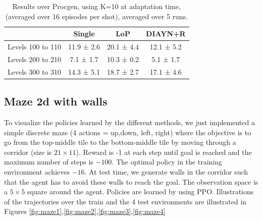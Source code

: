 \begin{table}[h!]
\begin{center}
    \begin{tabular}{l|c|c|c|} \toprule
        &	Single	& LoP &	DIAYN+R 	\\ \hline

Levels 100 to 110	&	11.9 ± 2.6	& 20.1 ± 4.4	& 12.1 ± 5.2		\\ 
Levels 200 to 210	&	7.1 ± 1.7	& 10.3 ± 0.2	& 5.1 ± 1.7		\\ 
Levels 300 to 310	&	14.3 ± 5.1	& 18.7 ± 2.7	& 17.1 ± 4.6		\\ \hline
\end{tabular}
\caption{Results over Procgen, using K=10 at adaptation time, (averaged over 16 episodes per shot), averaged over 5 runs. }
\end{center}
\end{table}


\newpage

\subsection{Maze 2d with walls}
\label{subsec:maze2d}

To visualize the policies learned by the different methods, we just implemented a simple discrete maze (4 actions = up,down, left, right) where the objective is to go from the top-middle tile to the bottom-middle tile by moving through a corridor (size is $21 \times 11$). Reward is -1 at each step until goal is reached and the maximum number of steps is $-100$. The optimal policy in the training environment achieves $-16$.  At test time, we generate walls in the corridor such that the agent has to avoid these walls to reach the goal. The observation space is a $5 \times 5$ square around the agent. Policies are learned by using PPO. 
Illustrations of the trajectories over the train and the 4 test environments are illustrated in Figures \ref{fig:maze1},\ref{fig:maze2},\ref{fig:maze3},\ref{fig:maze4}


